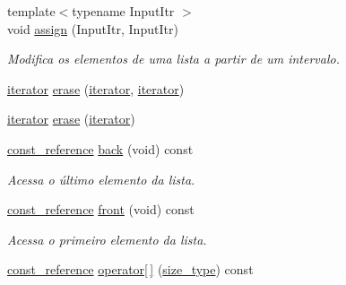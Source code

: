 \begin{DoxyCompactItemize}
\mbox{\label{classsc_1_1vector_aa9429f55d5ca3f7916fffa4e654d35dc}} 
{\footnotesize template$<$typename Input\+Itr $>$ }\\void \hyperlink{classsc_1_1vector_aa9429f55d5ca3f7916fffa4e654d35dc}{assign} (Input\+Itr, Input\+Itr)
\begin{DoxyCompactList}\small\item\em Modifica os elementos de uma lista a partir de um intervalo. \end{DoxyCompactList}\item 
\hyperlink{classsc_1_1vector_a9e5d5cc35e379aa27a93989f4a71413c}{iterator} \hyperlink{classsc_1_1vector_a916036c5dc2ec3dacea42f08706bce33}{erase} (\hyperlink{classsc_1_1vector_a9e5d5cc35e379aa27a93989f4a71413c}{iterator}, \hyperlink{classsc_1_1vector_a9e5d5cc35e379aa27a93989f4a71413c}{iterator})
\item 
\hyperlink{classsc_1_1vector_a9e5d5cc35e379aa27a93989f4a71413c}{iterator} \hyperlink{classsc_1_1vector_a1671cc04a48cfbf8b3baf2c6274aa44d}{erase} (\hyperlink{classsc_1_1vector_a9e5d5cc35e379aa27a93989f4a71413c}{iterator})
\item 
\mbox{\label{classsc_1_1vector_a3b924e6f20777a29ef818a1805c7b357}} 
\hyperlink{classsc_1_1vector_a8da2b1a11b069241100f9b2e14f481a0}{const\+\_\+reference} \hyperlink{classsc_1_1vector_a3b924e6f20777a29ef818a1805c7b357}{back} (void) const
\begin{DoxyCompactList}\small\item\em Acessa o último elemento da lista. \end{DoxyCompactList}\item 
\mbox{\label{classsc_1_1vector_aedc64f83fbbef7412eebbc609c0499d7}} 
\hyperlink{classsc_1_1vector_a8da2b1a11b069241100f9b2e14f481a0}{const\+\_\+reference} \hyperlink{classsc_1_1vector_aedc64f83fbbef7412eebbc609c0499d7}{front} (void) const
\begin{DoxyCompactList}\small\item\em Acessa o primeiro elemento da lista. \end{DoxyCompactList}\item 
\mbox{\label{classsc_1_1vector_af4883ec0fe8c11c4030200fde515eec7}} 
\hyperlink{classsc_1_1vector_a8da2b1a11b069241100f9b2e14f481a0}{const\+\_\+reference} \hyperlink{classsc_1_1vector_af4883ec0fe8c11c4030200fde515eec7}{operator\mbox{[}$\,$\mbox{]}} (\hyperlink{classsc_1_1vector_a48bf37ba1a6d0c13504414d86e27c399}{size\+\_\+type}) const

\end{DoxyCompactItemize}
